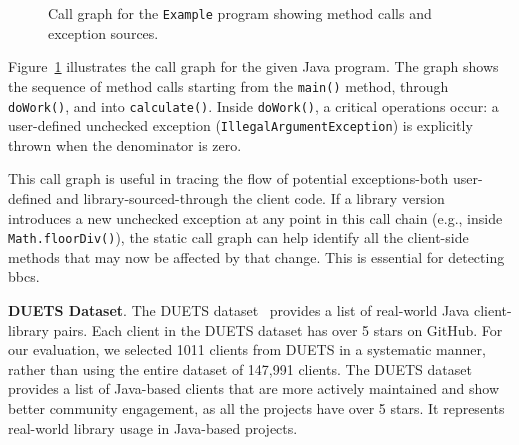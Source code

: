 \begin{figure}[h]
\centering
{}
\caption{Call graph for the \texttt{Example} program showing method calls and exception sources.}
\label{fig:callgraph-example}
\end{figure}

Figure~\ref{fig:callgraph-example} illustrates the call graph for the given Java program. The graph shows the sequence of method calls starting from the \texttt{main()} method, through \texttt{doWork()}, and into \texttt{calculate()}. Inside \texttt{doWork()}, a critical operations occur: a user-defined unchecked exception (\texttt{IllegalArgumentException}) is explicitly thrown when the denominator is zero.

This call graph is useful in tracing the flow of potential exceptions-both user-defined and library-sourced-through the client code. If a library version introduces a new unchecked exception at any point in this call chain (e.g., inside \texttt{Math.floorDiv()}), the static call graph can help identify all the client-side methods that may now be affected by that change. This is essential for detecting \glspl{bbc}.

\textbf{DUETS Dataset}. The DUETS dataset~\cite{durieux21:_duets} provides a list of real-world Java
client-library pairs. Each client in the DUETS dataset has over 5 stars on GitHub. For our evaluation,
we selected 1011 clients from DUETS in a systematic manner, rather than using the
entire dataset of 147,991 clients. The DUETS dataset provides a list of Java-based clients that are
more actively maintained and show better community engagement, as all the projects have over 5 stars.
It represents real-world library usage in Java-based projects.

